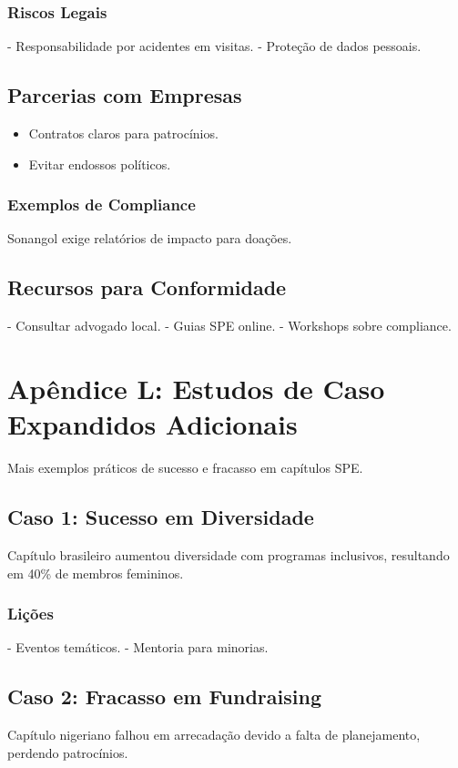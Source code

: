 \documentclass[12pt]{article}
\begin{document}
\subsubsection{Riscos Legais}
- Responsabilidade por acidentes em visitas.
- Proteção de dados pessoais.

\subsection{Parcerias com Empresas}
\begin{itemize}
    \item Contratos claros para patrocínios.
    \item Evitar endossos políticos.
\end{itemize}

\subsubsection{Exemplos de Compliance}
Sonangol exige relatórios de impacto para doações.

\subsection{Recursos para Conformidade}
- Consultar advogado local.
- Guias SPE online.
- Workshops sobre compliance.

\section{Apêndice L: Estudos de Caso Expandidos Adicionais}

Mais exemplos práticos de sucesso e fracasso em capítulos SPE.

\subsection{Caso 1: Sucesso em Diversidade}
Capítulo brasileiro aumentou diversidade com programas inclusivos, resultando em 40\% de membros femininos.

\subsubsection{Lições}
- Eventos temáticos.
- Mentoria para minorias.

\subsection{Caso 2: Fracasso em Fundraising}
Capítulo nigeriano falhou em arrecadação devido a falta de planejamento, perdendo patrocínios.
\end{document}
